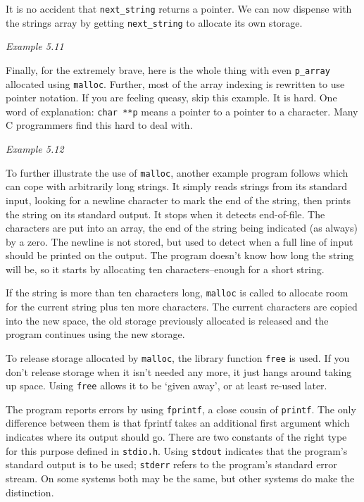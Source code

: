   It is no accident that \texttt{next\_string} returns a pointer. We
   can now dispense with the strings array by getting
   \texttt{next\_string} to allocate its own storage.


   \begin{center}\textit{Example 5.11}\end{center}


  Finally, for the extremely brave, here is the whole thing with even
   \texttt{p\_array} allocated using \texttt{malloc}. Further, most
   of the array indexing is rewritten to use pointer notation. If you are
   feeling queasy, skip this example. It is hard. One word of explanation:
   \texttt{char **p} means a pointer to a pointer to a character. Many
   C programmers find this hard to deal with.


   \begin{center}\textit{Example 5.12}\end{center}


  To further illustrate the use of \texttt{malloc}, another example
   program follows which can cope with arbitrarily long strings. It simply
   reads strings from its standard input, looking for a newline character to
   mark the end of the string, then prints the string on its standard
   output.  It stops when it detects end-of-file. The characters are put
   into an array, the end of the string being indicated (as always) by
   a zero. The newline is not stored, but used to detect when a full line of
   input should be printed on the output. The program doesn't know how long
   the string will be, so it starts by allocating ten characters--enough
   for a short string.


  If the string is more than ten characters long, \texttt{malloc} is
   called to allocate room for the current string plus ten more characters.
   The current characters are copied into the new space, the old storage
   previously allocated is released and the program continues using the new
   storage.


  To release storage allocated by \texttt{malloc}, the library
   function \texttt{free} is used. If you don't release storage when it
   isn't needed any more, it just hangs around taking up space. Using
   \texttt{free} allows it to be `given away', or at least re-used
   later.


  The program reports errors by using \texttt{fprintf}, a close
   cousin of \texttt{printf}. The only difference between them is that
   fprintf takes an additional first argument which indicates where its
   output should go. There are two constants of the right type for this
   purpose defined in \texttt{stdio.h}. Using \texttt{stdout}
   indicates that the program's standard output is to be used;
   \texttt{stderr} refers to the program's standard error stream. On
   some systems both may be the same, but other systems do make the
   distinction.


